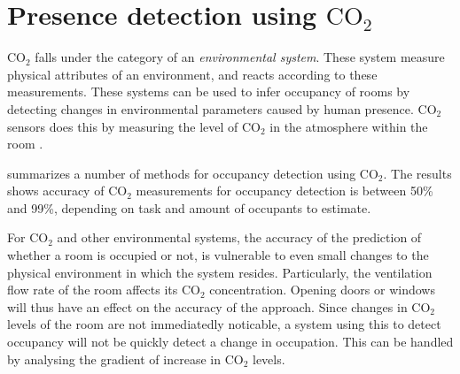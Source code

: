\section{Presence detection using $\text{CO}_{2}$ }\label{sec:presence_env}
$\text{CO}_{2}$ falls under the category of an \textit{environmental system}. 
These system measure physical attributes of an environment, and reacts according to these measurements.
These systems can be used to infer occupancy of rooms by detecting changes in environmental parameters caused by human presence.
$\text{CO}_{2}$ sensors does this by measuring the level of $\text{CO}_{2}$ in the atmosphere within the room \cite{longoAccurateOccupancyEstimation2019, gruberCO2SensorsOccupancy2014}.

\citeauthor{longoAccurateOccupancyEstimation2019}\cite{longoAccurateOccupancyEstimation2019} summarizes a number of methods for occupancy detection using $\text{CO}_{2}$. 
The results shows accuracy of $\text{CO}_{2}$ measurements for occupancy detection is between 50\% and 99\%, depending on task and amount of occupants to estimate.

For $\text{CO}_{2}$ and other environmental systems, the accuracy of the prediction of whether a room is occupied or not, is vulnerable to even small changes to the physical environment in which the system resides.\cite{gruberCO2SensorsOccupancy2014,longoAccurateOccupancyEstimation2019}
Particularly, the ventilation flow rate of the room affects its $\text{CO}_{2}$ concentration. Opening doors or windows will thus have an effect on the accuracy of the approach.
Since changes in $\text{CO}_{2}$ levels of the room are not immediatedly noticable, a system using this to detect occupancy will not be quickly detect a change in occupation.
This can be handled by analysing the gradient of increase in $\text{CO}_{2}$ levels\cite{gradient_co2}.
